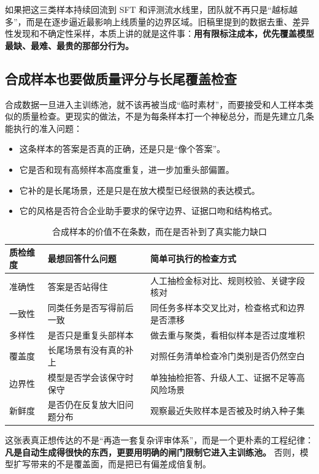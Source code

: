 如果把这三类样本持续回流到 SFT 和评测流水线里，团队就不再只是“越标越多”，而是在逐步逼近最影响上线质量的边界区域。旧稿里提到的数据去重、差异性发现和不确定性采样，本质上讲的就是这件事：\textbf{用有限标注成本，优先覆盖模型最缺、最难、最贵的那部分行为。}

\subsection{合成样本也要做质量评分与长尾覆盖检查}
合成数据一旦进入主训练池，就不该再被当成“临时素材”，而要接受和人工样本类似的质量检查。更现实的做法，不是为每条样本打一个神秘总分，而是先建立几条能执行的准入问题：
\begin{itemize}
  \item 这条样本的答案是否真的正确，还是只是“像个答案”。
  \item 它是否和现有高频样本高度重复，进一步加重头部偏置。
  \item 它补的是长尾场景，还是只是在放大模型已经很熟的表达模式。
  \item 它的风格是否符合企业助手要求的保守边界、证据口吻和结构格式。
\end{itemize}

\begin{table}[H]
\centering
\small
\begin{tabularx}{\textwidth}{>{\raggedright\arraybackslash}p{2.5cm}>{\raggedright\arraybackslash}p{3.4cm}>{\raggedright\arraybackslash}X}
\toprule
\textbf{质检维度} & \textbf{最想回答什么问题} & \textbf{简单可执行的检查方式} \\
\midrule
准确性 & 答案是否站得住 & 人工抽检金标对比、规则校验、关键字段核对 \\
一致性 & 同类任务是否写得前后一致 & 同任务多样本交叉比对，检查格式和边界是否漂移 \\
多样性 & 是否只是重复头部样本 & 做去重与聚类，看相似样本是否过度堆积 \\
覆盖度 & 长尾场景有没有真的补上 & 对照任务清单检查冷门类别是否仍然空白 \\
边界性 & 模型是否学会该保守时保守 & 单独抽检拒答、升级人工、证据不足等高风险场景 \\
新鲜度 & 是否仍在反复放大旧问题分布 & 观察最近失败样本是否被及时纳入种子集 \\
\bottomrule
\end{tabularx}
\caption{合成样本的价值不在条数，而在是否补到了真实能力缺口}
\label{tab:synthetic-quality-gates}
\end{table}

这张表真正想传达的不是“再造一套复杂评审体系”，而是一个更朴素的工程纪律：\textbf{凡是自动生成得很快的东西，更要用明确的闸门限制它进入主训练池。} 否则，模型扩写带来的不是覆盖面，而是把已有偏差成倍复制。

